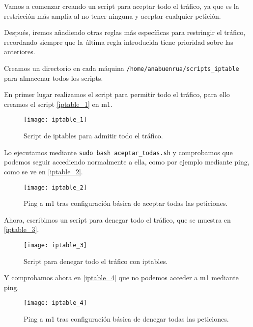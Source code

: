 Vamos a comenzar creando un script para aceptar todo el tráfico, ya que es la restricción más amplia al no tener ninguna y aceptar cualquier petición.

Después, iremos añadiendo otras reglas más específicas para restringir el tráfico, recordando siempre que la última regla introducida tiene prioridad sobre las anteriores.

Creamos un directorio en cada máquina \verb|/home/anabuenrua/scripts_iptable| para almacenar todos los scripts.

En primer lugar realizamos el script para permitir todo el tráfico, para ello creamos el script \eqref{iptable_1} en m1.

\begin{figure}[h!]
\begin{center}
\caption{Script de iptables para admitir todo el tráfico.}
\label{iptable_1}
\texttt{[image: iptable\_1]}
\end{center}
\end{figure}

Lo ejecutamos mediante \verb|sudo bash aceptar_todas.sh| y comprobamos que podemos seguir accediendo normalmente a ella, como por ejemplo mediante ping, como se ve en \eqref{iptable_2}.

\begin{figure}[h!]
\begin{center}
\caption{Ping a m1 tras configuración básica de aceptar todas las peticiones.}
\label{iptable_2}
\texttt{[image: iptable\_2]}
\end{center}
\end{figure}

Ahora, escribimos un script para denegar todo el tráfico, que se muestra en \eqref{iptable_3}.

\begin{figure}[h!]
\begin{center}
\caption{Script para denegar todo el tráfico con iptables.}
\label{iptable_3}
\texttt{[image: iptable\_3]}
\end{center}
\end{figure}

Y comprobamos ahora en \eqref{iptable_4} que no podemos acceder a m1 mediante ping.

\begin{figure}[h!]
\begin{center}
\caption{Ping a m1 tras configuración básica de denegar todas las peticiones.}
\label{iptable_4}
\texttt{[image: iptable\_4]}
\end{center}
\end{figure}

